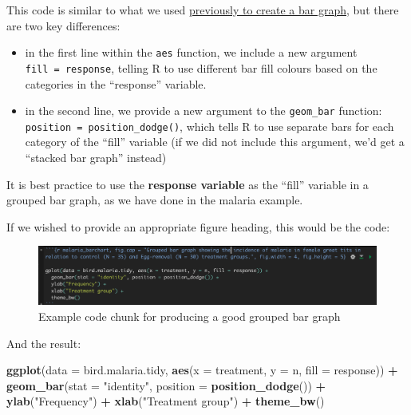 \documentclass[
]{book}
\newenvironment{Shaded}{\begin{snugshade}}{\end{snugshade}}
\newcommand{\AttributeTok}[1]{\textcolor[rgb]{0.13,0.29,0.53}{#1}}
\newcommand{\FunctionTok}[1]{\textcolor[rgb]{0.13,0.29,0.53}{\textbf{#1}}}
\newcommand{\NormalTok}[1]{#1}
\newcommand{\SpecialCharTok}[1]{\textcolor[rgb]{0.81,0.36,0.00}{\textbf{#1}}}
\newcommand{\StringTok}[1]{\textcolor[rgb]{0.31,0.60,0.02}{#1}}
\providecommand{\tightlist}{%
  \setlength{\itemsep}{0pt}\setlength{\parskip}{0pt}}
\begin{document}
This code is similar to what we used \hyperref[vis_cat_barchart]{previously to create a bar graph}, but there are two key differences:

\begin{itemize}
\tightlist
\item
  in the first line within the \texttt{aes} function, we include a new argument \texttt{fill\ =\ response}, telling R to use different bar fill colours based on the categories in the ``response'' variable.\\
\item
  in the second line, we provide a new argument to the \texttt{geom\_bar} function: \texttt{position\ =\ position\_dodge()}, which tells R to use separate bars for each category of the ``fill'' variable (if we did not include this argument, we'd get a ``stacked bar graph'' instead)
\end{itemize}

It is best practice to use the \textbf{response variable} as the ``fill'' variable in a grouped bar graph, as we have done in the malaria example.

If we wished to provide an appropriate figure heading, this would be the code:

\begin{figure}
\includegraphics[width=29.25in]{./more/grouped_bar_graph} \caption{Example code chunk for producing a good grouped bar graph}\label{fig:unnamed-chunk-41}
\end{figure}

And the result:

\begin{Shaded}
\begin{Highlighting}[]
\FunctionTok{ggplot}\NormalTok{(}\AttributeTok{data =}\NormalTok{ bird.malaria.tidy, }\FunctionTok{aes}\NormalTok{(}\AttributeTok{x =}\NormalTok{ treatment, }\AttributeTok{y =}\NormalTok{ n, }\AttributeTok{fill =}\NormalTok{ response)) }\SpecialCharTok{+} 
  \FunctionTok{geom\_bar}\NormalTok{(}\AttributeTok{stat =} \StringTok{"identity"}\NormalTok{, }\AttributeTok{position =} \FunctionTok{position\_dodge}\NormalTok{()) }\SpecialCharTok{+} 
  \FunctionTok{ylab}\NormalTok{(}\StringTok{"Frequency"}\NormalTok{) }\SpecialCharTok{+}
  \FunctionTok{xlab}\NormalTok{(}\StringTok{"Treatment group"}\NormalTok{) }\SpecialCharTok{+}
  \FunctionTok{theme\_bw}\NormalTok{()}
\end{Highlighting}
\end{Shaded}
\end{document}
